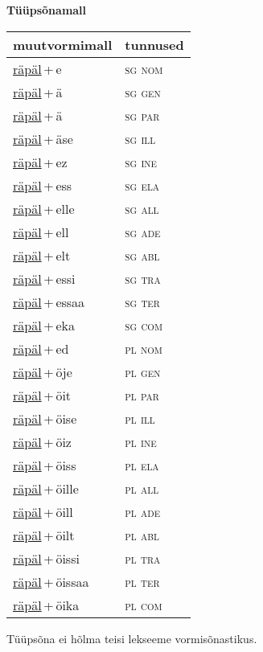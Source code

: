 
\vspace{1.8em}
\begin{minipage}{\textwidth}
\textbf{Tüüpsõnamall \,}\\

\begin{sideways}
\begin{tabular}{l l}
muutvormimall & tunnused \\
\hline
\underline{räpäl}\,+\,e & \textsc{ sg nom } \\
\underline{räpäl}\,+\,ä & \textsc{ sg gen } \\
\underline{räpäl}\,+\,ä & \textsc{ sg par } \\
\underline{räpäl}\,+\,äse & \textsc{ sg ill } \\
\underline{räpäl}\,+\,ez & \textsc{ sg ine } \\
\underline{räpäl}\,+\,ess & \textsc{ sg ela } \\
\underline{räpäl}\,+\,elle & \textsc{ sg all } \\
\underline{räpäl}\,+\,ell & \textsc{ sg ade } \\
\underline{räpäl}\,+\,elt & \textsc{ sg abl } \\
\underline{räpäl}\,+\,essi & \textsc{ sg tra } \\
\underline{räpäl}\,+\,essaa & \textsc{ sg ter } \\
\underline{räpäl}\,+\,eka & \textsc{ sg com } \\
\underline{räpäl}\,+\,ed & \textsc{ pl nom } \\
\underline{räpäl}\,+\,öje & \textsc{ pl gen } \\
\underline{räpäl}\,+\,öit & \textsc{ pl par } \\
\underline{räpäl}\,+\,öise & \textsc{ pl ill } \\
\underline{räpäl}\,+\,öiz & \textsc{ pl ine } \\
\underline{räpäl}\,+\,öiss & \textsc{ pl ela } \\
\underline{räpäl}\,+\,öille & \textsc{ pl all } \\
\underline{räpäl}\,+\,öill & \textsc{ pl ade } \\
\underline{räpäl}\,+\,öilt & \textsc{ pl abl } \\
\underline{räpäl}\,+\,öissi & \textsc{ pl tra } \\
\underline{räpäl}\,+\,öissaa & \textsc{ pl ter } \\
\underline{räpäl}\,+\,öika & \textsc{ pl com } \\
\end{tabular}
\end{sideways}
\label{tab:tüüpsõnamall-räpäle}

\end{minipage}

 
\vspace{1em}
\noindent Tüüpsõna ei hõlma teisi lekseeme vormi\-sõnastikus.

